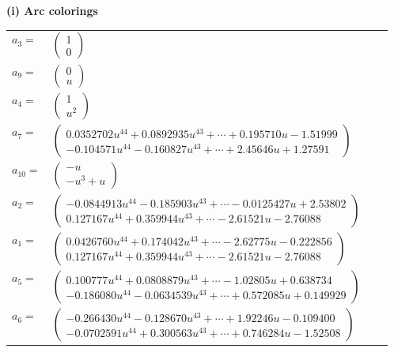 \documentclass[1p]{elsarticle_modified}
\theoremstyle{definition}
\begin{document}
\flushleft \textbf{(i) Arc colorings}\\
\begin{tabular}{m{7pt} m{180pt} m{7pt} m{180pt} }
\flushright $a_{3}=$&$\begin{pmatrix}1\\0\end{pmatrix}$ \\
\flushright $a_{9}=$&$\begin{pmatrix}0\\u\end{pmatrix}$ \\
\flushright $a_{4}=$&$\begin{pmatrix}1\\u^2\end{pmatrix}$ \\
\flushright $a_{7}=$&$\begin{pmatrix}0.0352702 u^{44}+0.0892935 u^{43}+\cdots+0.195710 u-1.51999\\-0.104571 u^{44}-0.160827 u^{43}+\cdots+2.45646 u+1.27591\end{pmatrix}$ \\
\flushright $a_{10}=$&$\begin{pmatrix}- u\\- u^3+u\end{pmatrix}$ \\
\flushright $a_{2}=$&$\begin{pmatrix}-0.0844913 u^{44}-0.185903 u^{43}+\cdots-0.0125427 u+2.53802\\0.127167 u^{44}+0.359944 u^{43}+\cdots-2.61521 u-2.76088\end{pmatrix}$ \\
\flushright $a_{1}=$&$\begin{pmatrix}0.0426760 u^{44}+0.174042 u^{43}+\cdots-2.62775 u-0.222856\\0.127167 u^{44}+0.359944 u^{43}+\cdots-2.61521 u-2.76088\end{pmatrix}$ \\
\flushright $a_{5}=$&$\begin{pmatrix}0.100777 u^{44}+0.0808879 u^{43}+\cdots-1.02805 u+0.638734\\-0.186080 u^{44}-0.0634539 u^{43}+\cdots+0.572085 u+0.149929\end{pmatrix}$ \\
\flushright $a_{6}=$&$\begin{pmatrix}-0.266430 u^{44}-0.128670 u^{43}+\cdots+1.92246 u-0.109400\\-0.0702591 u^{44}+0.300563 u^{43}+\cdots+0.746284 u-1.52508\end{pmatrix}$ \\

\end{tabular}
\end{document}
